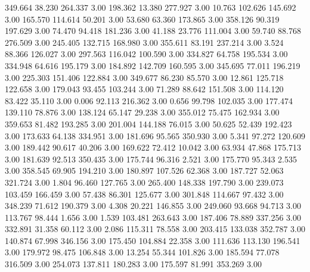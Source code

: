  349.664   38.230  264.337         3.00
 198.362   13.380  277.927         3.00
  10.763  102.626  145.692         3.00
 165.570  114.614   50.201         3.00
  53.680   63.360  173.865         3.00
 358.126   90.319  197.629         3.00
  74.470   94.418  181.236         3.00
  41.188   23.776  111.004         3.00
  59.740   88.768  276.509         3.00
 245.405  132.715  168.980         3.00
 355.611   83.191  237.214         3.00
   3.524   88.366  126.027         3.00
 297.563  116.042  100.590         3.00
 334.827   64.758  195.534         3.00
 334.948   64.616  195.179         3.00
 184.892  142.709  160.595         3.00
 345.695   77.011  196.219         3.00
 225.303  151.406  122.884         3.00
 349.677   86.230   85.570         3.00
  12.861  125.718  122.658         3.00
 179.043   93.455  103.244         3.00
  71.289   88.642  151.508         3.00
 114.120   83.422   35.110         3.00
   0.006   92.113  216.362         3.00
   0.656   99.798  102.035         3.00
 177.474  139.110   78.876         3.00
 138.124   65.147   29.238         3.00
 355.012   75.475  162.934         3.00
 359.653   81.482  193.285         3.00
 201.004  144.188   76.015         3.00
  50.625   52.439  192.423         3.00
 173.633   64.138  334.951         3.00
 181.696   95.565  350.930         3.00
   5.341   97.272  120.609         3.00
 189.442   90.617   40.206         3.00
 169.622   72.412   10.042         3.00
  63.934   47.868  175.713         3.00
 181.639   92.513  350.435         3.00
 175.744   96.316    2.521         3.00
 175.770   95.343    2.535         3.00
 358.545   69.905  194.210         3.00
 180.897  107.526   62.368         3.00
 187.727   52.063  321.724         3.00
   1.804   96.460  127.765         3.00
 265.400  148.338  197.790         3.00
 239.073  103.459  166.459         3.00
  57.438   86.301  125.677         3.00
 301.848  114.667   97.432         3.00
 348.239   71.612  190.379         3.00
   4.308   20.221  146.855         3.00
 249.060   93.668   94.713         3.00
 113.767   98.444    1.656         3.00
   1.539  103.481  263.643         3.00
 187.406   78.889  337.256         3.00
 332.891   31.358   60.112         3.00
   2.086  115.311   78.558         3.00
 203.415  133.038  352.787         3.00
 140.874   67.998  346.156         3.00
 175.450  104.884   22.358         3.00
 111.636  113.130  196.541         3.00
 179.972   98.475  106.848         3.00
  13.254   55.344  101.826         3.00
 185.594   77.078  316.509         3.00
 254.073  137.811  180.283         3.00
 175.597   81.991  353.269         3.00
